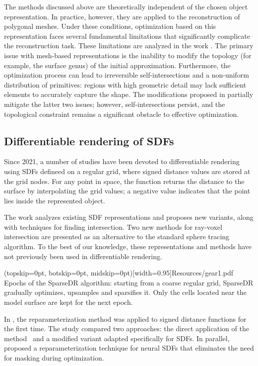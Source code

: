 \documentclass{ieeeaccess}
\begin{document}
The methods discussed above are theoretically independent of the chosen object representation. In practice, however, they are applied to the reconstruction of polygonal meshes. Under these conditions, optimization based on this representation faces several fundamental limitations that significantly complicate the reconstruction task. These limitations are analyzed in the work \cite{Nicolet}. The primary issue with mesh-based representations is the inability to modify the topology (for example, the surface genus) of the initial approximation. Furthermore, the optimization process can lead to irreversible self-intersections and a non-uniform distribution of primitives: regions with high geometric detail may lack sufficient elements to accurately capture the shape. The modifications proposed in \cite{Nicolet} partially mitigate the latter two issues; however, self-intersections persist, and the topological constraint remains a significant obstacle to effective optimization.

\subsection{Differentiable rendering of SDFs}

Since 2021, a number of studies have been devoted to differentiable rendering using SDFs defineed on a regular grid, where signed distance values are stored at the grid nodes. For any point in space, the function returns the distance to the surface by interpolating the grid values; a negative value indicates that the point lies inside the represented object.

The work \cite{HanssonSoderlund} analyzes existing SDF representations and proposes new variants, along with techniques for finding intersection. Two new methods for ray-voxel intersection are presented as an alternative to the standard sphere tracing algorithm. To the best of our knowledge, these representations and methods have not previously been used in differentiable rendering.

\Figure[h](topskip=0pt, botskip=0pt, midskip=0pt)[width=0.95\textwidth]{Resources/gear1.pdf} {
    Epochs of the SparseDR algorithm: starting from a coarse regular grid, SparseDR gradually optimizes, upsamples and sparsifies it. Only the cells located near the model surface are kept for the next epoch. \label{figSparseDR}
}

In \cite{DRSDF}, the reparameterization method was applied to signed distance functions for the first time. The study compared two approaches: the direct application of the method~\cite{Reparam} and a modified variant adapted specifically for SDFs. In parallel, \cite{NeuDRSDF} proposed a reparameterization technique for neural SDFs that eliminates the need for masking during optimization.
\end{document}
